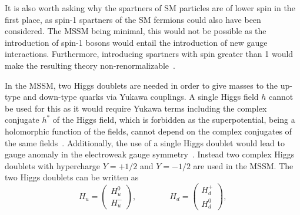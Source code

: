 It is also worth asking why the spartners of SM particles are of lower spin in the first place, as \eg spin-1 spartners of the SM fermions could also have been considered. The MSSM being minimal, this would not be possible as the introduction of spin-1 bosons would entail the introduction of new gauge interactions. Furthermore, introducing spartners with spin greater than 1 would make the resulting theory non-renormalizable~\cite{Bustamante:2009us}.

In the MSSM, two Higgs doublets are needed in order to give masses to the up-type and down-type quarks via Yukawa couplings. A single Higgs field $h$ cannot be used for this as it would require Yukawa terms including the complex conjugate $h^*$ of the Higgs field, which is forbidden as the superpotential, being a holomorphic function of the fields, cannot depend on the complex conjugates of the same fields~\cite{Bustamante:2009us}. Additionally, the use of a single Higgs doublet would lead to gauge anomaly in the electroweak gauge symmetry~\cite{PhysRevD.6.429}. Instead two complex Higgs doublets with hypercharge $Y = +1/2$ and $Y = -1/2$ are used in the MSSM. The two Higgs doublets can be written as
\begin{equation}
	H_u = \begin{pmatrix}
		H^0_u \\
		H^-_u
	\end{pmatrix}, \qquad \qquad
	H_d = \begin{pmatrix}
		H^+_d \\
		H^0_d
	\end{pmatrix},
	\label{eq:Higgs_doublets}
\end{equation}

